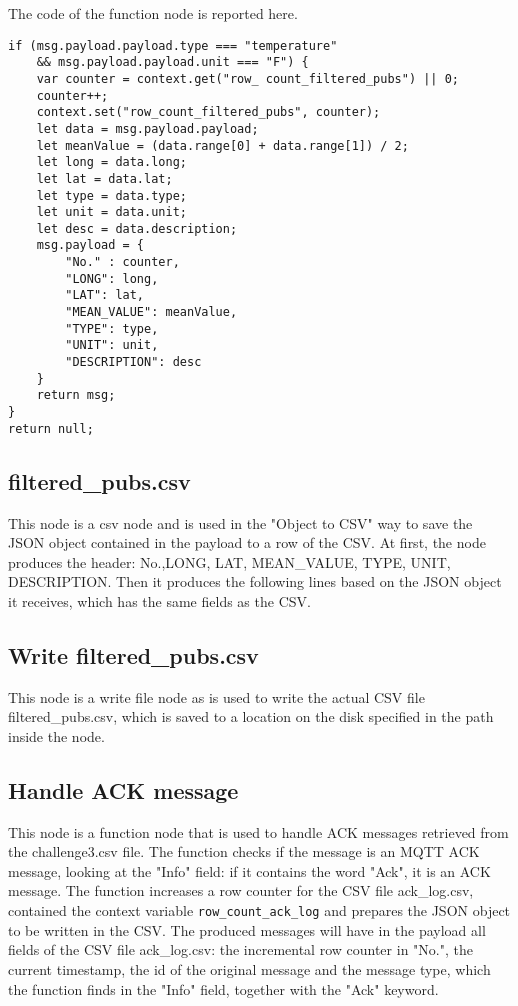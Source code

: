 The code of the function node is reported here.
\begin{verbatim}
if (msg.payload.payload.type === "temperature" 
	&& msg.payload.payload.unit === "F") {
    var counter = context.get("row_ count_filtered_pubs") || 0;
    counter++;
    context.set("row_count_filtered_pubs", counter);
    let data = msg.payload.payload;
    let meanValue = (data.range[0] + data.range[1]) / 2;
    let long = data.long;
    let lat = data.lat;
    let type = data.type;
    let unit = data.unit;
    let desc = data.description;
    msg.payload = {
        "No." : counter,
        "LONG": long,
        "LAT": lat,
        "MEAN_VALUE": meanValue,
        "TYPE": type,
        "UNIT": unit,
        "DESCRIPTION": desc
    }
    return msg;
}
return null;
\end{verbatim}

\subsection{filtered\_pubs.csv}
This node is a csv node and is used in the "Object to CSV" way to save the JSON object contained in the payload to a row of the CSV. At first, the node produces the header: No.,LONG, LAT, MEAN\_VALUE, TYPE, UNIT, DESCRIPTION. Then it produces the following lines based on the JSON object it receives, which has the same fields as the CSV.

\subsection{Write filtered\_pubs.csv}
This node is a write file node as is used to write the actual CSV file filtered\_pubs.csv, which is saved to a location on the disk specified in the path inside the node.

\subsection{Handle ACK message}
This node is a function node that is used to handle ACK messages retrieved from the challenge3.csv file. The function checks if the message is an MQTT ACK message, looking at the "Info" field: if it contains the word "Ack", it is an ACK message. The function increases a row counter for the CSV file ack\_log.csv, contained the context variable \verb|row_count_ack_log| and prepares the JSON object to be written in the CSV. The produced messages will have in the payload all fields of the CSV file ack\_log.csv: the incremental row counter in "No.", the current timestamp, the id of the original message and the message type, which the function finds in the "Info" field, together with the "Ack" keyword.

